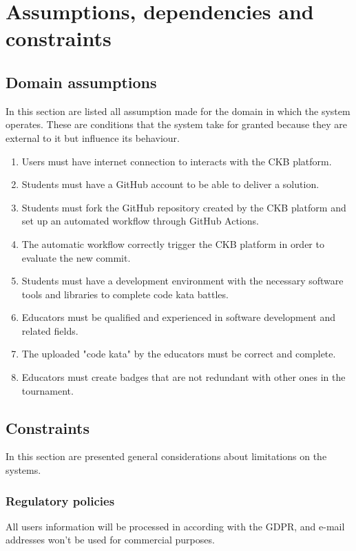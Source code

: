 \section{Assumptions, dependencies and constraints}

\subsection{Domain assumptions}
In this section are listed all assumption made for the domain in which the system operates. These are conditions that the system take for granted because they are external to it but influence its behaviour.
\begin{enumerate}[label=\textbf{DA.\arabic*}]
        \item {} {Users must have internet connection to interacts with the CKB platform.}
        \item {} {Students must have a GitHub account to be able to deliver a solution.}
        \item {} {Students must fork the GitHub repository created by the CKB platform and set up an automated workflow through GitHub Actions.}
        \item {} {The automatic workflow correctly trigger the CKB platform in order to evaluate the new commit.}
        \item {} {Students must have a development environment with the necessary software tools and libraries to complete code kata battles.}
        \item {} {Educators must be qualified and experienced in software development and related fields.}
        \item {} {The uploaded "code kata" by the educators must be correct and complete.}
        \item {} {Educators must create badges that are not redundant with other ones in the tournament.}
\end{enumerate}

\subsection{Constraints}
In this section are presented general considerations about limitations on the systems.

\subsubsection*{Regulatory policies}
All users information will be processed in according with the GDPR, and e-mail addresses won't be used for commercial purposes.
